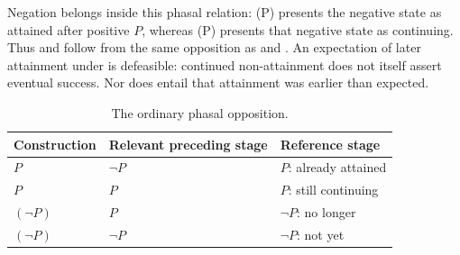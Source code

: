 Negation belongs inside this phasal relation: (\neg P) presents the
negative state as attained after positive $P$, whereas (\neg P)
presents that negative state as continuing. Thus  and
 follow from the same opposition as  and
. An expectation of later attainment under  is
defeasible: continued non-attainment does not itself assert eventual success.
Nor does  entail that attainment was earlier than expected.

\begin{table}[ht]
\caption{The ordinary phasal opposition.}\label{tab:phasal-polarity}
\begin{tabularx}{\textwidth}{l L L}
\toprule
Construction & Relevant preceding stage & Reference stage \\
\midrule
{} $P$ & $\neg P$ & $P$: already attained \\
 $P$ & $P$ & $P$: still continuing \\
 $(\neg P)$ & $P$ & $\neg P$: no longer \\
 $(\neg P)$ & $\neg P$ & $\neg P$: not yet \\
\bottomrule
\end{tabularx}
\end{table}



